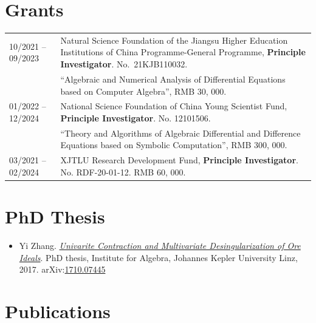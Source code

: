 \documentclass[a4paper,12pt]{article}
\begin{document}
\section*{\Large{Grants}}
\begin{tabular}{@{}p{1.4in}p{4in}}
10/2021 -- 09/2023 & Natural Science Foundation of the Jiangsu Higher Education Institutions of China Programme-General Programme, 
                                       \textbf{Principle Investigator}. No.\ 21KJB110032. \\
                                   & ``Algebraic and Numerical Analysis of Differential Equations based on Computer Algebra'', RMB 30, 000. \\     
01/2022 -- 12/2024 & National Science Foundation of China Young Scientist Fund, \textbf{Principle Investigator}. No. 12101506. \\
                                 & ``Theory and Algorithms of Algebraic Differential and Difference Equations based on Symbolic Computation'',
                                 RMB 300, 000. \\
03/2021 -- 02/2024    & XJTLU Research Development Fund, \textbf{Principle Investigator}. No. RDF-20-01-12. RMB 60, 000.

\end{tabular}

\section*{\Large{PhD Thesis}}
\begin{itemize}
 \item Yi Zhang. \href{https://yzhang1616.github.io/yzhang_PhDthesis_final.pdf}{{\em Univarite 
                Contraction and Multivariate Desingularization of Ore Ideals}}. 
                PhD thesis, Institute for Algebra, Johannes Kepler University Linz, 2017. 
                arXiv:\href{https://arxiv.org/abs/1710.07445}{1710.07445}
\end{itemize}

\section*{\Large{Publications}}
\end{document}
